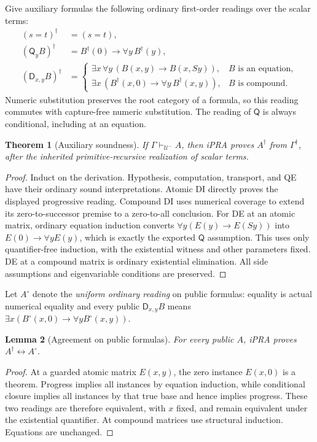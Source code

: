 \documentclass[11pt,letterpaper]{article}
\newtheorem{theorem}{Theorem}[section]
\newtheorem{lemma}[theorem]{Lemma}
\theoremstyle{definition}\newtheorem{definition}[theorem]{Definition}
\theoremstyle{remark}\newtheorem{remark}[theorem]{Remark}
\newcommand{\D}{\mathsf D}
\newcommand{\Q}{\mathsf Q}
\newcommand{\U}{\mathcal U^{-}}
\begin{document}
Give auxiliary formulas the following ordinary first-order readings over
the scalar terms:
\[
 \begin{aligned}
 (s=t)^\dagger&=(s=t),\\
 (\Q_y B)^\dagger&=B^\dagger(0)\to\forall y\,B^\dagger(y),\\
 (\D_{x,y}B)^\dagger&=
 \begin{cases}
 \exists x\,\forall y\,(B(x,y)\to B(x,Sy)),&B\text{ is an equation},\\
 \exists x\,(B^\dagger(x,0)\to\forall y\,B^\dagger(x,y)),
       &B\text{ is compound}.
 \end{cases}
 \end{aligned}
\]
Numeric substitution preserves the root category of a formula, so this
reading commutes with capture-free numeric substitution.  The reading of
$\Q$ is always conditional, including at an equation.

\begin{theorem}[Auxiliary soundness]\label{thm:aux-soundness}
If $\Gamma\vdash_{\U}A$, then iPRA proves $A^\dagger$ from
$\Gamma^\dagger$, after the inherited primitive-recursive realization
of scalar terms.
\end{theorem}
\begin{proof}
Induct on the derivation.  Hypothesis, computation, transport, and QE
have their ordinary sound interpretations.  Atomic DI directly proves
the displayed progressive reading.  Compound DI uses numerical coverage
to extend its zero-to-successor premise to a zero-to-all conclusion.
For DE at an atomic matrix, ordinary equation induction converts
$\forall y(E(y)\to E(Sy))$ into $E(0)\to\forall yE(y)$, which is
exactly the exported $\Q$ assumption.  This uses only quantifier-free
induction, with the existential witness and other parameters fixed.
DE at a compound matrix is ordinary existential elimination.
All side assumptions and eigenvariable conditions are preserved.
\end{proof}

Let $A^\circ$ denote the \emph{uniform ordinary reading} on public
formulas: equality is actual numerical equality and every public
$\D_{x,y}B$ means $\exists x(B^\circ(x,0)\to\forall yB^\circ(x,y))$.

\begin{lemma}[Agreement on public formulas]\label{lem:public-agreement}
For every public $A$, iPRA proves $A^\dagger\leftrightarrow A^\circ$.
\end{lemma}
\begin{proof}
At a guarded atomic matrix $E(x,y)$, the zero instance $E(x,0)$ is a
theorem.  Progress implies all instances by equation induction, while
conditional closure implies all instances by that true base and hence
implies progress.  These two readings are therefore equivalent, with
$x$ fixed, and remain equivalent under the existential quantifier.
At compound matrices use structural induction.  Equations are unchanged.
\end{proof}
\end{document}
